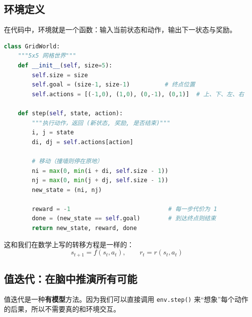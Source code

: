 \subsection{环境定义}

在代码中，环境就是一个函数：输入当前状态和动作，输出下一状态与奖励。

\begin{lstlisting}[language=Python]
class GridWorld:
    """5x5 网格世界"""
    def __init__(self, size=5):
        self.size = size
        self.goal = (size-1, size-1)          # 终点位置
        self.actions = [(-1,0), (1,0), (0,-1), (0,1)]  # 上、下、左、右
    
    def step(self, state, action):
        """执行动作，返回 (新状态, 奖励, 是否结束)"""
        i, j = state
        di, dj = self.actions[action]
        
        # 移动（撞墙则停在原地）
        ni = max(0, min(i + di, self.size - 1))
        nj = max(0, min(j + dj, self.size - 1))
        new_state = (ni, nj)
        
        reward = -1                            # 每一步代价为 1
        done = (new_state == self.goal)        # 到达终点则结束
        return new_state, reward, done
\end{lstlisting}

这和我们在数学上写的转移方程是一样的：
\[
s_{t+1} = f(s_t, a_t), \qquad r_t = r(s_t, a_t)
\]

\subsection{值迭代：在脑中推演所有可能}

值迭代是一种\textbf{有模型}方法。因为我们可以直接调用 \texttt{env.step()} 来“想象”每个动作的后果，所以不需要真的和环境交互。

